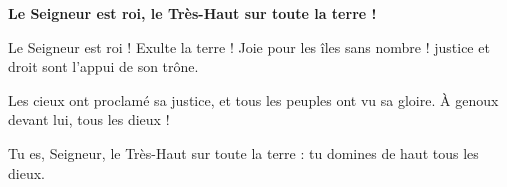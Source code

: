 \textbf{Le Seigneur est roi, le Très-Haut sur toute la terre !}

Le Seigneur est roi ! Exulte la terre !
Joie pour les îles sans nombre !
justice et droit sont l’appui de son trône.

Les cieux ont proclamé sa justice,
et tous les peuples ont vu sa gloire.
À genoux devant lui, tous les dieux !

Tu es, Seigneur, le Très-Haut
sur toute la terre :
tu domines de haut tous les dieux.

